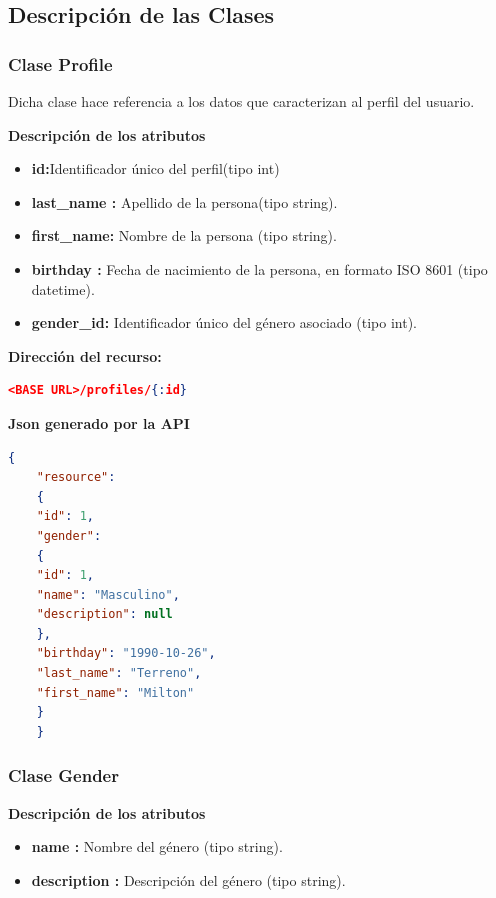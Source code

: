 \subsection{Descripción de las Clases}

    \subsubsection{ Clase Profile}
    Dicha clase hace referencia a los datos que caracterizan al perfil del usuario.

    \textbf{Descripción de los atributos}
    \begin{itemize}
            \item \textbf{id:}Identificador único del perfil(tipo int)
			\item\textbf{ last\_name 	:}	Apellido de la persona(tipo string).
			\item \textbf{ first\_name: } 	Nombre de la persona (tipo string).
			\item \textbf{birthday 	:}	Fecha de nacimiento de la persona, en formato ISO 8601 (tipo datetime).
			\item \textbf{gender\_id:} 	Identificador único del género asociado 	(tipo int).
    \end{itemize} 
	\textbf{Dirección del recurso:}
    \begin{lstlisting}[language=json,firstnumber=1]
    <BASE URL>/profiles/{:id}
    \end{lstlisting}

    \textbf{Json generado por la API}    
    \begin{lstlisting}[language=json,firstnumber=1]
    {
    "resource": 
    {
    "id": 1,
    "gender": 
    {
    "id": 1,
    "name": "Masculino",
    "description": null
    },
    "birthday": "1990-10-26",
    "last_name": "Terreno",
    "first_name": "Milton"
    }
    }
    \end{lstlisting}

\subsubsection{Clase Gender} 
    \textbf{Descripción de los atributos}
	\begin{itemize}
            \item \textbf{name :}	Nombre del género (tipo string).
            \item \textbf{description 	:}	Descripción del género (tipo string).
    \end{itemize} 
    
